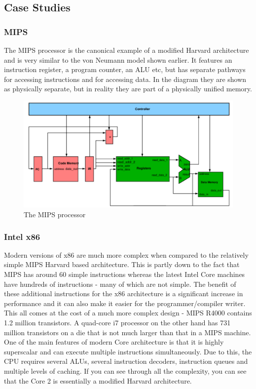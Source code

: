 \documentclass{article}
\begin{document}
	\subsection{Case Studies}
	\subsubsection{MIPS}
	The MIPS processor is the canonical example of a modified Harvard architecture and is very similar to the von Neumann model shown earlier. It features an instruction register, a program counter, an ALU etc, but has separate pathways for accessing instructions and for accessing data. In the diagram they are shown as physically separate, but in reality they are part of a physically unified memory.
	
	\begin{figure}[h]
		\centering
		\includegraphics[width=\textwidth]{mips_architecture}
		\caption{The MIPS processor}
		\label{fig:mips processor}
	\end{figure}
	
	\subsubsection{Intel x86}
	Modern versions of x86 are much more complex when compared to the relatively simple MIPS Harvard based architecture. This is partly down to the fact that MIPS has around 60 simple instructions whereas the latest Intel Core machines have hundreds of instructions - many of which are not simple. The benefit of these additional instructions for the x86 architecture is a significant increase in performance and it can also make it easier for the programmer/compiler writer. This all comes at the cost of a much more complex design - MIPS R4000 contains 1.2 million transistors. A quad-core i7 processor on the other hand has 731 million transistors on a die that is not much larger than that in a MIPS machine. One of the main features of modern Core architecture is that it is highly superscalar and can execute multiple instructions simultaneously. Due to this, the CPU requires several ALUs, several instruction decoders, instruction queues and multiple levels of caching. If you can see through all the complexity, you can see that the Core 2 is essentially a modified Harvard architecture.
	
\end{document}
